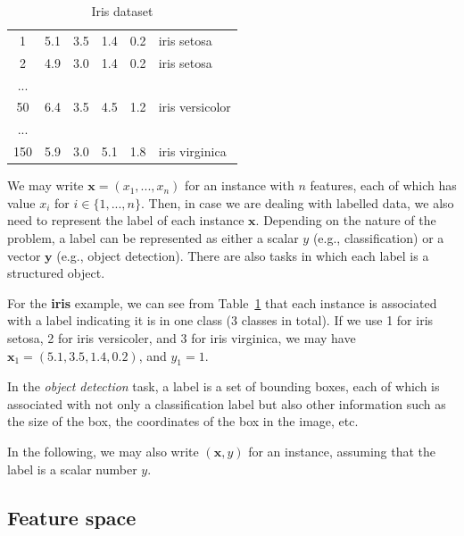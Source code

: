 \begin{example}
\begin{table}[!htbp]
\begin{minipage}{0.6\textwidth}
\begin{tabular}{|c|c|c|c|c|l|}
         \hline
       1  & 5.1 & 3.5 & 1.4 & 0.2 & iris setosa \\
       2  & 4.9 & 3.0 & 1.4 & 0.2 & iris setosa \\
       ... &&&&& \\
       50  & 6.4 & 3.5 & 4.5 & 1.2 & iris versicolor \\
       ... &&&&&\\
       150  & 5.9 & 3.0 & 5.1 & 1.8 & iris virginica \\
       \hline
    \end{tabular}
    \caption{Iris dataset}
    \label{tab:irisdataset}
\end{minipage}
\end{table}
\end{example}


We may write $\textbf{x}=(x_1,...,x_n)$ for an instance with $n$ features, each of which has value $x_i$ for $i\in \{1,...,n\}$. 
%
Then, in case we are dealing with labelled data, we also need to represent the label of each instance $\textbf{x}$. Depending on the nature of the problem, a label can be represented as either a scalar $y$ (e.g., classification) or a vector $\textbf{y}$ (e.g., object detection). There are also tasks in which each label is a structured object. 

\begin{example}
For the \textbf{iris} example, we can see from Table~\ref{tab:irisdataset} that each instance is associated with a label indicating it is in one class (3 classes in total). If we use 1 for iris setosa, 2 for iris versicoler, and 3 for iris virginica, we may have $\textbf{x}_1=(5.1,3.5,1.4,0.2)$, and $y_1=1$. 
\end{example}

\begin{example}
In the \emph{object detection} task, a label is a set of bounding boxes, each of which is associated with not only a classification label but also other information such as the size of the box, the coordinates of the box in the image, etc. 
\end{example}
 

In the following, we may also write $(\textbf{x},y)$ for an instance, assuming that the label is a scalar number $y$. 

\subsection*{Feature space} 

